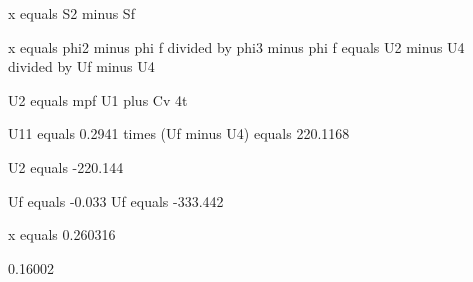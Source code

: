 x equals S2 minus Sf

x equals phi2 minus phi f divided by phi3 minus phi f equals U2 minus U4 divided by Uf minus U4

U2 equals mpf U1 plus Cv 4t

U11 equals 0.2941 times (Uf minus U4) equals 220.1168

U2 equals -220.144

Uf equals -0.033 Uf equals -333.442

x equals 0.260316

0.16002